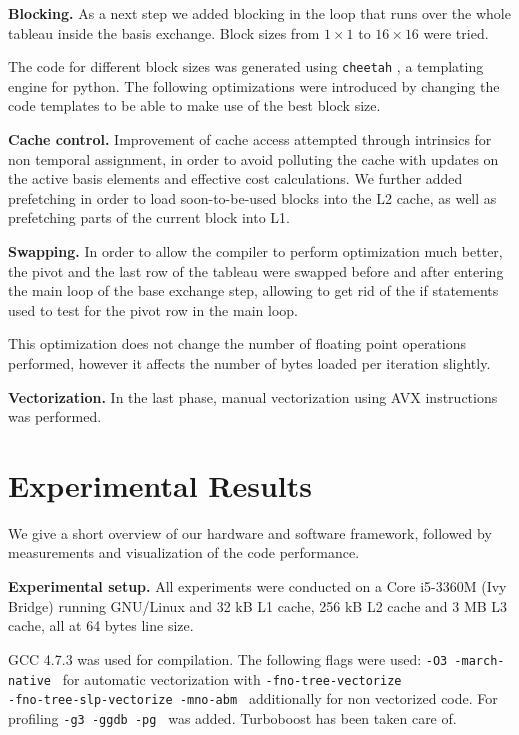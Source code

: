 \documentclass[letterpaper]{article}
\newcommand{\mypar}[1]{{\bf #1.}}
\begin{document}
\mypar{Blocking}
As a next step we added blocking in the loop that runs over the whole tableau 
inside the basis exchange. Block sizes from $1 \times 1$ to $16 \times 16$ were tried.

The code for different block sizes was generated using 
{\tt cheetah} \cite{cheetah}, a templating engine for python. The following optimizations were introduced
by changing the code templates to be able to make use of the best block size.

\mypar{Cache control}
Improvement of cache access attempted through intrinsics for non temporal assignment, in order to avoid polluting the cache with updates on the active basis elements and
effective cost calculations. We further added prefetching in order to load soon-to-be-used blocks into the L2 cache, as well as prefetching parts of the current block into L1.

\mypar{Swapping}
In order to allow the compiler to perform optimization much better, the pivot and the last row
of the tableau were swapped before and after entering the main loop of the base exchange step,
allowing to get rid of the if statements used to test for the pivot row in the main loop.

This optimization does not change the number of floating point operations performed, however it affects the number of bytes loaded per iteration slightly.

\mypar{Vectorization}
In the last phase, manual vectorization using AVX instructions was performed.


\section{Experimental Results}\label{sec:exp}

We give a short overview of our hardware and software framework, followed by measurements and visualization of the code performance.

\mypar{Experimental setup}
All experiments were conducted on a Core i5-3360M (Ivy Bridge) running GNU/Linux and 32 kB L1 cache, 256 kB L2 cache and 3 MB L3 cache, all at 64 bytes line size.

GCC 4.7.3 was used for compilation. The following flags were used:
{\tt -O3 -march\--native  } for automatic vectorization with {\tt -fno\--tree\--vectorize \\ -fno\--tree\--slp\--vectorize -mno\--abm } additionally for non vectorized code.
For profiling {\tt -g3 -ggdb -pg } was added. Turboboost has been taken care of.
\end{document}

